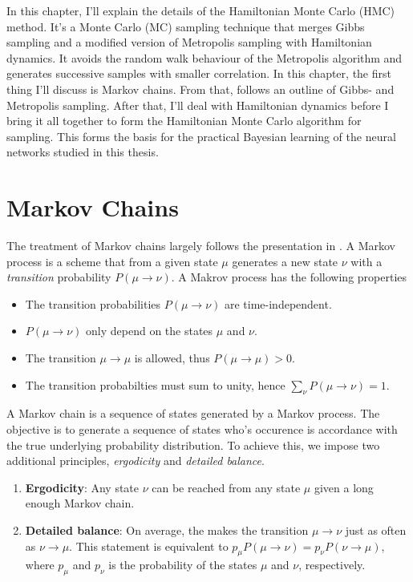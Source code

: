 In this chapter, I'll explain the details of the Hamiltonian Monte Carlo (HMC) method.
It's a Monte Carlo (MC) sampling technique that merges Gibbs sampling and a modified version of Metropolis sampling
with Hamiltonian dynamics. It avoids the random walk behaviour of the Metropolis algorithm
and generates successive samples with smaller correlation. In this chapter, the first thing I'll discuss is Markov chains.
From that, follows an outline of Gibbs- and Metropolis sampling. After that, I'll deal with Hamiltonian dynamics before I bring it all together
to form the Hamiltonian Monte Carlo algorithm for sampling. This forms the basis for the practical Bayesian learning of the neural networks studied in this thesis.

\section{Markov Chains}
The treatment of Markov chains largely follows the presentation in \cite{markov_chains}. A Markov process is a scheme that from a given state $\mu$ generates a new state $\nu$ with a \textit{transition} probability $P(\mu \to \nu)$. A Makrov process has the following properties
\begin{itemize}
  \item The transition probabilities $P(\mu \to \nu)$ are time-independent.
  \item $P(\mu \to \nu)$ only depend on the states $\mu$ and $\nu$.
  \item The transition $\mu \to \mu$ is allowed, thus $P(\mu \to \mu) > 0$.
  \item The transition probabilties must sum to unity, hence $\sum_\nu P(\mu \to \nu) = 1$.
\end{itemize}
A Markov chain is a sequence of states generated by a Markov process. 
The objective is to generate a sequence of states who's occurence is accordance with the true underlying probability distribution. To achieve this, we impose two additional principles, \textit{ergodicity} and \textit{detailed balance}. 
\begin{enumerate}
  \item \textbf{Ergodicity}: Any state $\nu$ can be reached from any state $\mu$ given a long enough Markov chain.
  \item \textbf{Detailed balance}: On average, the makes the transition $\mu \to \nu$ just as often as $\nu \to \mu$. This statement is equivalent to $p_\mu P(\mu \to \nu) = p_\nu P(\nu \to \mu)$, where $p_\mu$ and $p_\nu$ is the probability of the states $\mu$ and $\nu$, respectively.
\end{enumerate}



